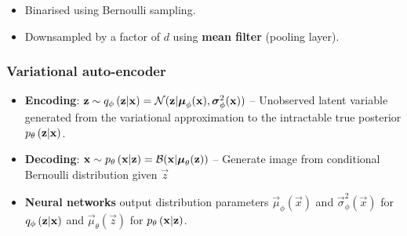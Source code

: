 \begin{itemize}
	\item Binarised using Bernoulli sampling.
	\item Downsampled by a factor of $d$ using \textbf{mean filter} (pooling layer).
\end{itemize}

\subsubsection{Variational auto-encoder}
\label{ssub:vae}

\begin{itemize}
	\item \textbf{Encoding}: $\bm{\mathrm{z}} \sim q_{\phi}\left(\bm{\mathrm{z}}|\bm{\mathrm{x}}\right) = \mathcal{N}( \bm{\mathrm{z}}|\bm{\mathrm{\mu}}_\phi(\bm{\mathrm{x}}),\bm{\mathrm{\sigma}}^2_\phi(\bm{\mathrm{x}}))$ -- Unobserved latent variable generated from the variational approximation to the intractable true posterior $p_{\theta}\left(\bm{\mathrm{z}}|\bm{\mathrm{x}}\right)$.
	\item \textbf{Decoding}: $\bm{\mathrm{x}} \sim p_{\theta}\left(\bm{\mathrm{x}}|\bm{\mathrm{z}}\right)=\mathcal{B}( \bm{\mathrm{x}}|\bm{\mathrm{\mu}}_\theta(\bm{\mathrm{z}}))$ -- Generate image from conditional Bernoulli distribution given $\vec{z}$
	\item \textbf{Neural networks} output distribution parameters $\vec{\mu}_\phi(\vec{x})$ and $\vec{\sigma}^2_\phi(\vec{x})$ for $q_{\phi}\left(\bm{\mathrm{z}}|\bm{\mathrm{x}}\right)$ and $\vec{\mu}_\theta(\vec{z})$ for $p_{\theta}\left(\bm{\mathrm{x}}|\bm{\mathrm{z}}\right)$.

\end{itemize}
